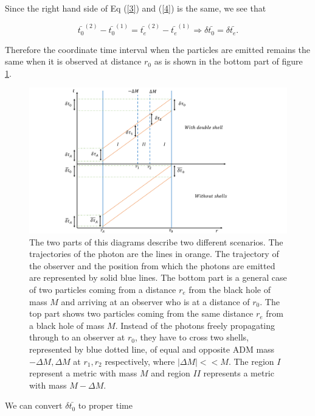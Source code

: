 \documentclass[aps,showpacs,onecolumn,floats,prd,superscriptaddress,nofootinbib]{revtex4}
\begin{document}
Since the right hand side of Eq (\ref{3}) and (\ref{4}) is the same, we see that

\begin{equation}
	\bar{t_0}^{(2)} - \bar{t_0}^{(1)} = \bar{t_e}^{(2)} - \bar{t_e}^{(1)} \Rightarrow \delta \bar{t_0} = \delta \bar{t_e}.
\end{equation}

Therefore the coordinate time interval when the particles are emitted remains the same when it is observed at distance $r_0$ as is shown in the bottom part of figure \ref{fig:1}.

\begin{figure}[h!]
\begin{center}
\includegraphics[scale = 0.6]{propertime.pdf}
\caption{The two parts of this diagrams describe two different scenarios. The trajectories of the photon are the lines in orange. The trajectory of the observer and the position from which the photons are emitted are represented by solid blue lines. The bottom part is a general case of two particles coming from a distance $r_e$ from the black hole of mass $M$ and arriving at an observer who is at a distance of $r_0$. The top part shows two particles coming from the same distance $r_e$ from a black hole of mass $M$. Instead of the photons freely propagating through to an observer at $r_0$, they have to cross two shells, represented by blue dotted line, of equal and opposite ADM mass $-\Delta M, \Delta M$ at $r_{1}, r_{2}$ respectively, where $|\Delta M|<<M$. The region $I$ represent a metric with mass $M$ and region $II$ represents a metric with mass $M-\Delta M$.}
\label{fig:1}
\end{center}
\end{figure}

We can convert $\delta\bar{t_0}$ to proper time
\end{document}
